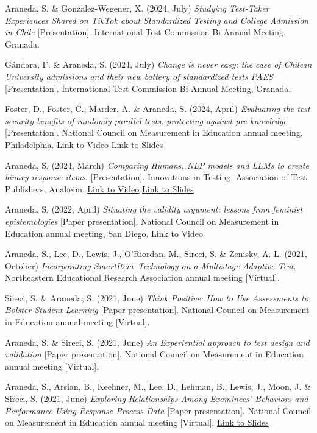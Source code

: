 \documentclass[10.5pt]{article}
\newcommand{\link}[2]{\href{#1}{\color{cvaccent}\uline{#2}}}
\newcommand{\pubentry}[2]{%
  \par\noindent\hangindent=14pt\hangafter=1\raggedright\color{cvink}#1\par\vspace{9pt}%
}
\begin{document}
\pubentry{Araneda, S. \& Gonzalez-Wegener, X. (2024, July) \textit{Studying Test-Taker Experiences Shared on TikTok about Standardized Testing and College Admission in Chile} [Presentation]. International Test Commission Bi-Annual Meeting, Granada.}{itc.png}
\pubentry{G\'andara, F. \& Araneda, S. (2024, July) \textit{Change is never easy: the case of Chilean University admissions and their new battery of standardized tests PAES} [Presentation]. International Test Commission Bi-Annual Meeting, Granada.}{itc.png}
\pubentry{Foster, D., Foster, C., Marder, A. \& Araneda, S. (2024, April) \textit{Evaluating the test security benefits of randomly parallel tests: protecting against pre-knowledge} [Presentation]. National Council on Measurement in Education annual meeting, Philadelphia. \link{https://www.youtube.com/watch?v=A6fOUrriuK4}{Link to Video} \link{https://www.researchgate.net/publication/393062010_Evaluating_the_Test_Security_Benefits_of_Randomly_Parallel_Tests_Protecting_Against_Pre-Knowledge}{Link to Slides}}{ncme.png}
\pubentry{Araneda, S. (2024, March) \textit{Comparing Humans, NLP models and LLMs to create binary response items}. [Presentation]. Innovations in Testing, Association of Test Publishers, Anaheim. \link{https://youtu.be/kl1XSzNrWWs}{Link to Video} \link{https://www.researchgate.net/publication/393062272_Comparing_Humans_NLP_Models_and_LLMs_to_Create_Binary_Response_Items}{Link to Slides}}{atp.png}
\pubentry{Araneda, S. (2022, April) \textit{Situating the validity argument: lessons from feminist epistemologies} [Paper presentation]. National Council on Measurement in Education annual meeting, San Diego. \link{https://www.youtube.com/watch?v=ghipI3boCwU}{Link to Video}}{ncme.png}
\pubentry{Araneda, S., Lee, D., Lewis, J., O'Riordan, M., Sireci, S. \& Zenisky, A. L. (2021, October) \textit{Incorporating SmartItem\texttrademark\ Technology on a Multistage-Adaptive Test}. Northeastern Educational Research Association annual meeting [Virtual].}{nera.png}
\pubentry{Sireci, S. \& Araneda, S. (2021, June) \textit{Think Positive: How to Use Assessments to Bolster Student Learning} [Paper presentation]. National Council on Measurement in Education annual meeting [Virtual].}{ncme.png}
\pubentry{Araneda, S. \& Sireci, S. (2021, June) \textit{An Experiential approach to test design and validation} [Paper presentation]. National Council on Measurement in Education annual meeting [Virtual].}{ncme.png}
\pubentry{Araneda, S., Arslan, B., Keehner, M., Lee, D., Lehman, B., Lewis, J., Moon, J. \& Sireci, S. (2021, June) \textit{Exploring Relationships Among Examinees' Behaviors and Performance Using Response Process Data} [Paper presentation]. National Council on Measurement in Education annual meeting [Virtual]. \link{https://www.researchgate.net/publication/352447567_Exploring_Relationships_Among_Examinees'_Behaviors_and_Performance_Using_Response_Process_Data}{Link to Slides}}{ncme.png}
\end{document}
